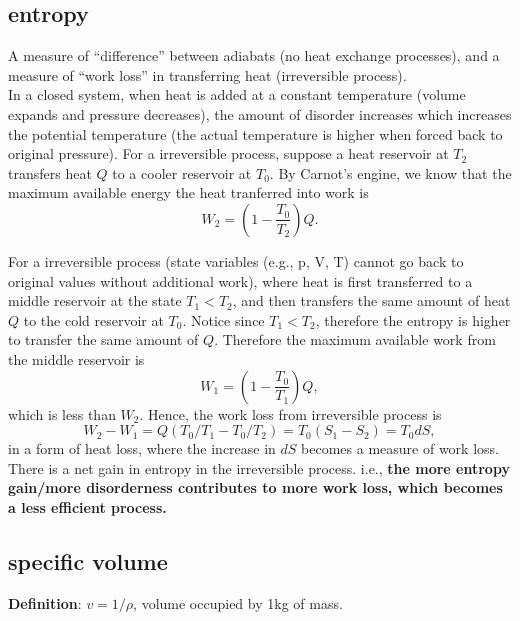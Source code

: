 \subsection{entropy}
A measure of ``difference'' between adiabats (no heat exchange processes), and a measure of ``work
loss'' in transferring heat (irreversible process). \\

In a closed system, when heat is added at a constant temperature (volume expands and pressure
decreases), the amount of disorder increases which increases the potential temperature (the actual
temperature is higher when forced back to original pressure). For a irreversible process, suppose a
heat reservoir at $T_2$ transfers heat $Q$ to a cooler reservoir at $T_0$. By Carnot's engine, we
know that the maximum available energy the heat tranferred into work is
\begin{equation}
    W_2 = (1-\frac{T_0}{T_2})Q.
\end{equation}

For a irreversible process (state variables (e.g., p, V, T) cannot go back to original values
without additional work), where heat is first transferred to a middle reservoir at the state $T_1 <
T_2$, and then transfers the same amount of heat $Q$ to the cold reservoir at $T_0$.
Notice since $T_1 < T_2$, therefore the entropy is higher to transfer the same amount of $Q$.
Therefore the maximum available work from the middle reservoir is
\begin{equation}
    W_1 = (1-\frac{T_0}{T_1})Q,
\end{equation}
which is less than $W_2$. Hence, the work loss from irreversible process is 
\begin{equation}
    W_2-W_1 = Q(T_0/T_1 - T_0/T_2) = T_0(S_1 - S_2) = T_0 dS,
\end{equation} 
in a form of heat loss, where the increase in $dS$ becomes a measure of work loss. 
There is a net gain in entropy in the irreversible process.
i.e., {\bf the more entropy gain/more disorderness contributes to more work loss, which becomes a
less efficient process.}

\subsection{specific volume}
{\bf Definition}: $v = 1/\rho$, volume occupied by 1kg of mass.

